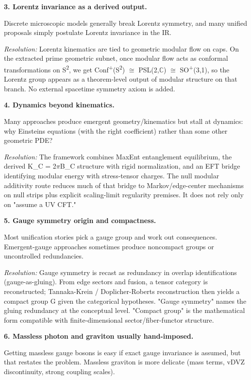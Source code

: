 \textbf{3. Lorentz invariance as a derived output.}

Discrete microscopic models generally break Lorentz symmetry, and many unified proposals simply postulate Lorentz invariance in the IR.

\emph{Resolution:} Lorentz kinematics are tied to geometric modular flow on caps. On the extracted prime geometric subnet, once modular flow acts as conformal transformations on S\textsuperscript{2}, we get Conf\textsuperscript{+}(S\textsuperscript{2}) \ensuremath{\cong} PSL(2,\ensuremath{\mathbb{C}}) \ensuremath{\cong} SO\textsuperscript{+}(3,1), so the Lorentz group appears as a theorem-level output of modular structure on that branch. No external spacetime symmetry axiom is added.

\textbf{4. Dynamics beyond kinematics.}

Many approaches produce emergent geometry/kinematics but stall at dynamics: why Einstein\textquotesingle s equations (with the right coefficient) rather than some other geometric PDE?

\emph{Resolution:} The framework combines MaxEnt entanglement equilibrium, the derived K\_C = 2\ensuremath{\pi}B\_C structure with rigid normalization, and an EFT bridge identifying modular energy with stress-tensor charges. The null modular additivity route reduces much of that bridge to Markov/edge-center mechanisms on null strips plus explicit scaling-limit regularity premises. It does not rely only on "assume a UV CFT."

\textbf{5. Gauge symmetry origin and compactness.}

Most unification stories pick a gauge group and work out consequences. Emergent-gauge approaches sometimes produce noncompact groups or uncontrolled redundancies.

\emph{Resolution:} Gauge symmetry is recast as redundancy in overlap identifications (gauge-as-gluing). From edge sectors and fusion, a tensor category is reconstructed; Tannaka-Krein / Doplicher-Roberts reconstruction then yields a compact group G given the categorical hypotheses. "Gauge symmetry" names the gluing redundancy at the conceptual level. "Compact group" is the mathematical form compatible with finite-dimensional sector/fiber-functor structure.

\textbf{6. Massless photon and graviton usually hand-imposed.}

Getting massless gauge bosons is easy if exact gauge invariance is assumed, but that restates the problem. Massless graviton is more delicate (mass terms, vDVZ discontinuity, strong coupling scales).

